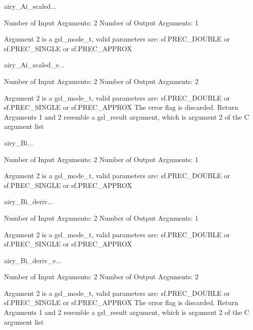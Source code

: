\begin{funcdesc}{airy_Ai_scaled}{...}

    Number of Input  Arguments:  2
    Number of Output Arguments:  1

 Argument 2 is a gsl_mode_t, valid parameters are:
	sf.PREC_DOUBLE or sf.PREC_SINGLE or sf.PREC_APPROX

\end{funcdesc}

\begin{funcdesc}{airy_Ai_scaled_e}{...}

    Number of Input  Arguments:  2
    Number of Output Arguments:  2

 Argument 2 is a gsl_mode_t, valid parameters are:
	sf.PREC_DOUBLE or sf.PREC_SINGLE or sf.PREC_APPROX
The error flag is discarded.
Return Arguments 1 and 2 resemble a gsl_result argument,
	which is  argument 2 of the C argument list

\end{funcdesc}

\begin{funcdesc}{airy_Bi}{...}

    Number of Input  Arguments:  2
    Number of Output Arguments:  1

 Argument 2 is a gsl_mode_t, valid parameters are:
	sf.PREC_DOUBLE or sf.PREC_SINGLE or sf.PREC_APPROX

\end{funcdesc}

\begin{funcdesc}{airy_Bi_deriv}{...}

    Number of Input  Arguments:  2
    Number of Output Arguments:  1

 Argument 2 is a gsl_mode_t, valid parameters are:
	sf.PREC_DOUBLE or sf.PREC_SINGLE or sf.PREC_APPROX

\end{funcdesc}

\begin{funcdesc}{airy_Bi_deriv_e}{...}

    Number of Input  Arguments:  2
    Number of Output Arguments:  2

 Argument 2 is a gsl_mode_t, valid parameters are:
	sf.PREC_DOUBLE or sf.PREC_SINGLE or sf.PREC_APPROX
The error flag is discarded.
Return Arguments 1 and 2 resemble a gsl_result argument,
	which is  argument 2 of the C argument list

\end{funcdesc}

